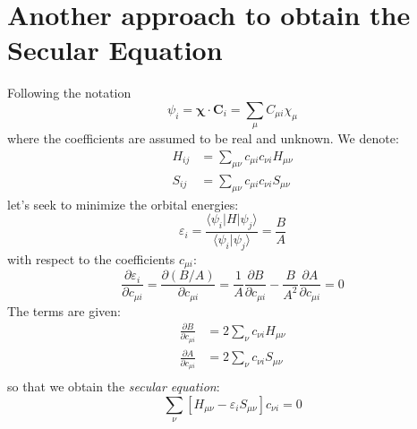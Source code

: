 \documentclass{article}
\newcommand{\pfrac}[2]{\frac{\partial #1}{\partial #2}}
\begin{document}
\section{Another approach to obtain the Secular Equation}
Following the notation 
\begin{equation}
    \psi_i = \mathbf{\chi}\cdot \mathbf{C}_i = \sum_{\mu} C_{\mu i} \chi_{\mu}
\end{equation}
where the coefficients are assumed to be real and unknown. We denote:
\begin{align}
    H_{ij} &= \sum_{\mu\nu} c_{\mu i} c_{\nu i} H_{\mu \nu} \\ 
    S_{ij} &= \sum_{\mu\nu} c_{\mu i} c_{\nu i} S_{\mu \nu} 
\end{align}
let's seek to minimize the orbital energies:
\begin{equation}
    \varepsilon_i = \frac{\langle \psi_i | H | \psi_j \rangle}{\langle \psi_i | \psi_j \rangle} = \frac{B}{A}
\end{equation}
with respect to the coefficients $c_{\mu i}$:
\begin{equation}
    \pfrac{\varepsilon_i}{c_{\mu i}} = \pfrac{(B/A)}{c_{\mu i}} = \frac{1}{A} \pfrac{B}{c_{\mu i}} - \frac{B}{A^2} \pfrac{A}{c_{\mu i}} = 0
\end{equation}
The terms are given:
\begin{align}
    \pfrac{B}{c_{\mu i}} &= 2 \sum_{\nu} c_{\nu i} H_{\mu \nu} \\
    \pfrac{A}{c_{\mu i}} &= 2 \sum_{\nu} c_{\nu i} S_{\mu \nu} \\
\end{align}
so that we obtain the \emph{secular equation}:
\begin{equation}
    \label{E:secular}
    \sum_{\nu} \left[ H_{\mu\nu} - \varepsilon_i S_{\mu\nu} \right] c_{\nu i} = 0
\end{equation}
\end{document}
